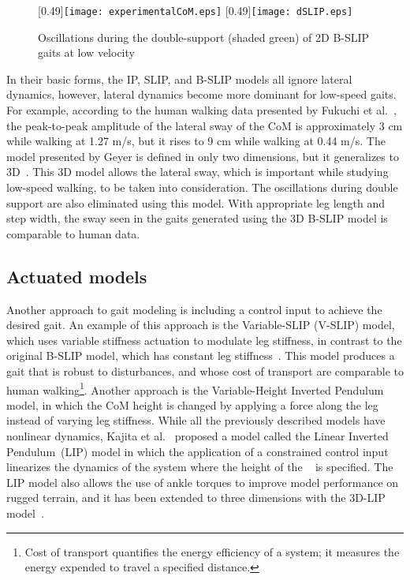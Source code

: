 \begin{figure}
	\centering
	[0.49\textwidth]{\texttt{[image: experimentalCoM.eps]}}%
	\hfill
	[0.49\textwidth]{\texttt{[image: dSLIP.eps]}}%
	\caption{Oscillations during the double-support (shaded green) of 2D B-SLIP gaits at low velocity} \label{fig:traj_compare}
\end{figure}

In their basic forms, the IP, SLIP, and B-SLIP models all ignore lateral dynamics, however, lateral dynamics become more dominant for low-speed gaits. For example, according to the human walking data presented by Fukuchi et al.~\cite{fukuchi2018public}, the peak-to-peak amplitude of the lateral sway of the CoM is approximately 3 cm while walking at 1.27 m/s, but it rises to 9 cm while walking at 0.44 m/s. The model presented by Geyer is defined in only two dimensions, but it generalizes to 3D~\cite{liu2015dynamic,liu2016terrain}. This 3D model allows the lateral sway, which is important while studying low-speed walking, to be taken into consideration. The  oscillations during double support are also eliminated using this model. With appropriate leg length and step width, the sway seen in the gaits generated using the 3D B-SLIP model is comparable to human data. %

\subsection{Actuated models}

Another approach to gait modeling is including a control input to achieve the desired gait. An example of this approach is the Variable-SLIP (V-SLIP) model, which uses variable stiffness actuation to modulate leg stiffness, in contrast to the original B-SLIP model, which has constant leg stiffness~\cite{visser2017bipedal}. This model produces a gait that is robust to disturbances, and whose cost of transport are comparable to human walking\footnote{Cost of transport quantifies the energy efficiency of a system; it measures the energy expended to travel a specified distance.}. Another approach is the Variable-Height Inverted Pendulum model, in which the CoM height is changed by applying a force along the leg~\cite{koolen2016balance} instead of varying leg stiffness. While all the previously described models have nonlinear dynamics, Kajita et al.~\cite{kajita1991study} proposed a model called the Linear Inverted Pendulum~(LIP) model in which the application of a constrained control input linearizes the dynamics of the system where the height of the \com~ is specified. The LIP model also allows the use of ankle torques to improve model performance on rugged terrain, and it has been extended to three dimensions with the 3D-LIP model~\cite{kajita20013d}.

